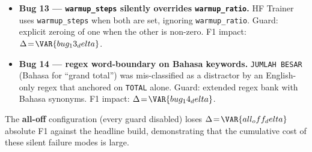 \begin{itemize}
\item \textbf{Bug 13 --- \texttt{warmup\_steps} silently overrides
      \texttt{warmup\_ratio}.}  HF Trainer uses
      \texttt{warmup\_steps} when both are set, ignoring
      \texttt{warmup\_ratio}.  Guard: explicit zeroing of one when
      the other is non-zero.  F1 impact: $\Delta\!=\!\VAR{bug_13_delta}$.

\item \textbf{Bug 14 --- regex word-boundary on Bahasa keywords.}
      \texttt{JUMLAH BESAR} (Bahasa for ``grand total'') was
      mis-classified as a distractor by an English-only regex
      that anchored on \texttt{TOTAL} alone.  Guard: extended regex
      bank with Bahasa synonyms.  F1 impact:
      $\Delta\!=\!\VAR{bug_14_delta}$.
\end{itemize}

The \textbf{all-off} configuration (every guard disabled) loses
$\Delta\!=\!\VAR{all_off_delta}$ absolute F1 against the headline
build, demonstrating that the cumulative cost of these silent
failure modes is large.
